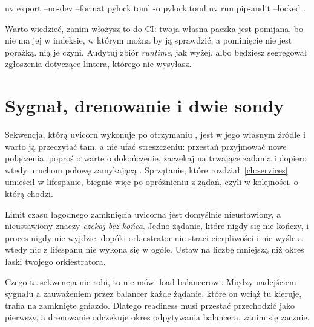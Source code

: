 \begin{shellcmd}
uv export --no-dev --format pylock.toml -o pylock.toml
uv run pip-audit --locked .
\end{shellcmd}

\noindent
Warto wiedzieć, zanim włożysz to do CI: twoja własna paczka jest pomijana,
bo nie ma jej w indeksie, w którym można by ją sprawdzić, a pominięcie nie
jest porażką.  nią je czyni. Audytuj zbiór
\emph{runtime}, jak wyżej, albo będziesz segregował zgłoszenia dotyczące
lintera, którego nie wysyłasz.

\section{Sygnał, drenowanie i dwie sondy}
\label{sec:ch12-shutdown}

Sekwencja, którą uvicorn wykonuje po otrzymaniu , jest w jego
własnym źródle i warto ją przeczytać tam, a nie ufać streszczeniu: przestań
przyjmować nowe połączenia, poproś otwarte o dokończenie, zaczekaj na
trwające zadania i dopiero wtedy uruchom połowę zamykającą .
Sprzątanie, które rozdział~\ref{ch:services} umieścił w lifespanie, biegnie
więc po opróżnieniu z żądań, czyli w kolejności, o którą chodzi.

\begin{warning}
Limit czasu łagodnego zamknięcia uvicorna jest domyślnie nieustawiony, a
nieustawiony znaczy \emph{czekaj bez końca}. Jedno żądanie, które nigdy się
nie kończy, i proces nigdy nie wyjdzie, dopóki orkiestrator nie straci
cierpliwości i nie wyśle  \dash{} a wtedy nic z lifespanu nie
wykona się w ogóle. Ustaw  na liczbę
mniejszą niż okres łaski twojego orkiestratora.
\end{warning}

\noindent
Czego ta sekwencja nie robi, to nie mówi load balancerowi. Między
nadejściem sygnału a zauważeniem przez balancer każde żądanie, które on
wciąż tu kieruje, trafia na zamknięte gniazdo. Dlatego readiness musi
przestać przechodzić jako pierwszy, a drenowanie odczekuje okres odpytywania
balancera, zanim się zacznie.



